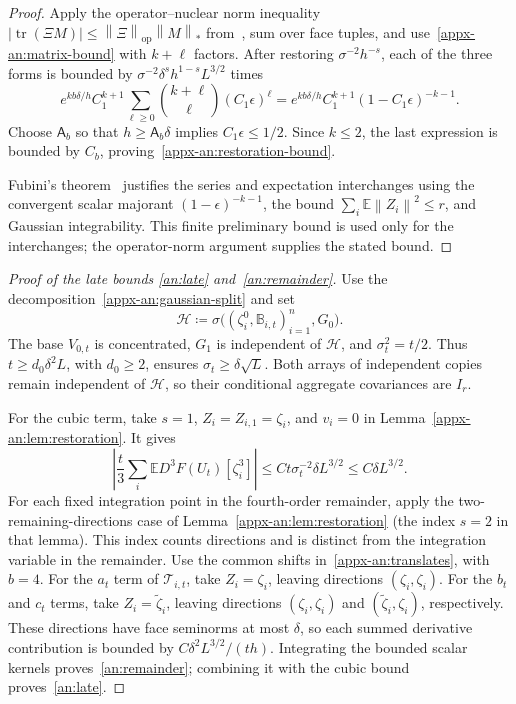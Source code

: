 \documentclass[11pt,letterpaper]{article}
\theoremstyle{remark}
\newcommand{\E}{\mathbb E}
\newcommand{\tr}{\operatorname{tr}}
\newcommand{\op}{\mathrm{op}}
\newcommand{\norm}[1]{\left\lVert#1\right\rVert}
\begin{document}
\begin{proof}
Apply the operator--nuclear norm inequality
\(|\tr(\Xi M)|\le\norm\Xi_\op\norm M_*\)
from~\cite[Chapter~IV]{Bhatia1997}, sum over face
tuples, and use~\eqref{appx-an:matrix-bound} with \(k+\ell\) factors.
After restoring \(\sigma^{-2}h^{-s}\), each of the three forms
is bounded by \(\sigma^{-2}\delta^sh^{1-s}L^{3/2}\) times
\[
 e^{kb\delta/h}C_1^{k+1}
 \sum_{\ell\ge0}\binom{k+\ell}{\ell}(C_1\epsilon)^\ell
 =e^{kb\delta/h}C_1^{k+1}(1-C_1\epsilon)^{-k-1}.
\]
Choose \(\mathsf A_b\) so that \(h\ge\mathsf A_b\delta\) implies
\(C_1\epsilon\le1/2\). Since \(k\le2\), the last expression is
bounded by \(C_b\), proving~\eqref{appx-an:restoration-bound}.

Fubini's theorem~\cite[Section~2.5]{Folland1999} justifies the
series and expectation interchanges using the convergent scalar
majorant \((1-\epsilon)^{-k-1}\), the bound
\(\sum_i\E\norm{Z_i}^2\le r\), and Gaussian integrability.
This finite preliminary bound is used only for the interchanges;
the operator-norm argument supplies the stated bound.
\end{proof}

\begin{proof}[Proof of the late bounds \eqref{an:late}
and~\eqref{an:remainder}]
Use the decomposition~\eqref{appx-an:gaussian-split} and set
\[
 \mathcal H\coloneqq
 \sigma\bigl((\zeta_i^0,\mathbb B_{i,t})_{i=1}^n,G_0\bigr).
\]
The base \(V_{0,t}\) is concentrated, \(G_1\) is independent
of \(\mathcal H\), and \(\sigma_t^2=t/2\).
Thus \(t\ge d_0\delta^2L\), with \(d_0\ge2\), ensures
\(\sigma_t\ge\delta\sqrt L\). Both arrays of independent copies
remain independent of \(\mathcal H\), so their conditional aggregate
covariances are \(I_r\).

For the cubic term, take \(s=1\), \(Z_i=Z_{i,1}=\zeta_i\), and
\(v_i=0\) in Lemma~\ref{appx-an:lem:restoration}. It gives
\begin{equation}
 \left|\frac t3\sum_i\E D^3F(U_t)[\zeta_i^3]\right|
 \le Ct\sigma_t^{-2}\delta L^{3/2}
 \le C\delta L^{3/2}.
 \label{appx-an:cubic-bound}
\end{equation}
For each fixed integration point in the fourth-order remainder,
apply the two-remaining-directions case of Lemma~\ref{appx-an:lem:restoration}
(the index \(s=2\) in that lemma). This index counts directions and
is distinct from the integration variable in the remainder.
Use the common shifts in~\eqref{appx-an:translates}, with \(b=4\). For the \(a_t\) term
of \(\mathcal T_{i,t}\), take \(Z_i=\zeta_i\), leaving directions
\((\zeta_i,\zeta_i)\). For the \(b_t\) and \(c_t\) terms,
take \(Z_i=\widetilde\zeta_i\), leaving directions
\((\zeta_i,\zeta_i)\) and \((\widetilde\zeta_i,\zeta_i)\),
respectively. These directions have face seminorms at most \(\delta\),
so each summed derivative contribution is bounded by
\(C\delta^2L^{3/2}/(t h)\). Integrating the bounded scalar
kernels proves~\eqref{an:remainder}; combining it with the cubic
bound proves~\eqref{an:late}.
\end{proof}
\end{document}
